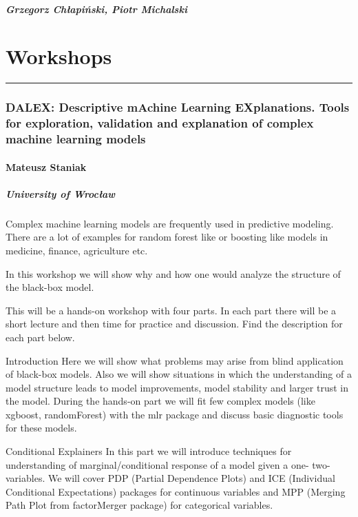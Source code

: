 \documentclass [12pt]{article}
\begin{document}
\subsubsection*{Grzegorz Chłapiński, Piotr Michalski}
\newpage
{}
\part{Workshops}
\noindent\rule{\textwidth}{1pt}
\section{DALEX: Descriptive mAchine Learning EXplanations. Tools for exploration, validation and explanation of complex machine learning models}
\subsection*{Mateusz Staniak}
\subsubsection*{University of Wrocław}

Complex machine learning models are frequently used in predictive modeling. There are a lot of examples for random forest like or boosting like models in medicine, finance, agriculture etc.

In this workshop we will show why and how one would analyze the structure of the black-box model.

This will be a hands-on workshop with four parts. In each part there will be a short lecture and then time for practice and discussion. Find the description for each part below.

Introduction Here we will show what problems may arise from blind application of black-box models. Also we will show situations in which the understanding of a model structure leads to model improvements, model stability and larger trust in the model. During the hands-on part we will fit few complex models (like xgboost, randomForest) with the mlr package and discuss basic diagnostic tools for these models.

Conditional Explainers In this part we will introduce techniques for understanding of marginal/conditional response of a model given a one- two- variables. We will cover PDP (Partial Dependence Plots) and ICE (Individual Conditional Expectations) packages for continuous variables and MPP (Merging Path Plot from factorMerger package) for categorical variables.
\end{document}
